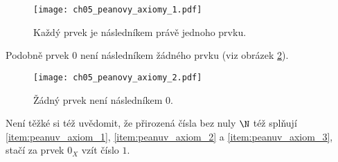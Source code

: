 \begin{figure}[H]
	\centering
	\texttt{[image: ch05\_peanovy\_axiomy\_1.pdf]}
    \caption{Každý prvek je následníkem právě jednoho prvku.}
    \label{fig:peanovy_axiomy_1}
\end{figure}
Podobně prvek $0$ není následníkem žádného prvku (viz obrázek \ref{fig:peanovy_axiomy_2}).
\begin{figure}[H]
	\centering
	\texttt{[image: ch05\_peanovy\_axiomy\_2.pdf]}
    \caption{Žádný prvek není následníkem 0.}
    \label{fig:peanovy_axiomy_2}
\end{figure}
Není těžké si též uvědomit, že přirozená čísla bez nuly $\N$ též splňují \ref{item:peanuv_axiom_1}, \ref{item:peanuv_axiom_2} a \ref{item:peanuv_axiom_3}, stačí za prvek $0_X$ vzít číslo $1$.